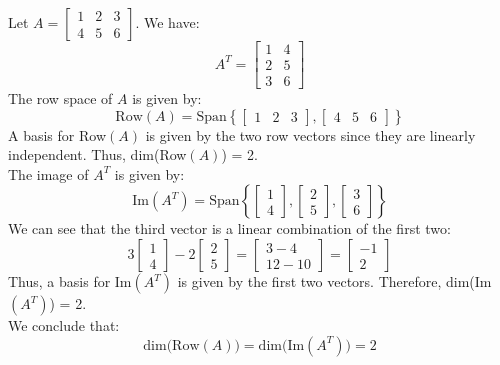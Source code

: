 \begin{eg}
    Let $A = \begin{bmatrix}
        1 & 2 & 3 \\
        4 & 5 & 6
    \end{bmatrix}$. We have:
    \[ A^T = \begin{bmatrix}
        1 & 4 \\
        2 & 5 \\
        3 & 6
    \end{bmatrix} \]
    The row space of $A$ is given by:
    \[ \text{Row}(A) = \text{Span}\left\{ \begin{bmatrix}
        1 & 2 & 3
    \end{bmatrix}, \begin{bmatrix}
        4 & 5 & 6
    \end{bmatrix} \right\} \]
    A basis for Row$(A)$ is given by the two row vectors since they are linearly independent. Thus, dim(Row$(A)$) = 2. \\
    The image of $A^T$ is given by:
    \[ \text{Im}(A^T) = \text{Span}\left\{ \begin{bmatrix}
        1 \\ 4
    \end{bmatrix}, \begin{bmatrix}
        2 \\ 5
    \end{bmatrix}, \begin{bmatrix}
        3 \\ 6
    \end{bmatrix} \right\} \]
    We can see that the third vector is a linear combination of the first two:
    \[ 3\begin{bmatrix}
        1 \\ 4
    \end{bmatrix} - 2\begin{bmatrix}
        2 \\ 5
    \end{bmatrix} = \begin{bmatrix}
        3 - 4 \\ 12 - 10
    \end{bmatrix} = \begin{bmatrix}
        -1 \\ 2
    \end{bmatrix} \]
    Thus, a basis for Im$(A^T)$ is given by the first two vectors. Therefore, dim(Im$(A^T)$) = 2. \\
    We conclude that:
    \[ \text{dim(Row}(A)) = \text{dim(Im}(A^T)) = 2 \]
\end{eg}
